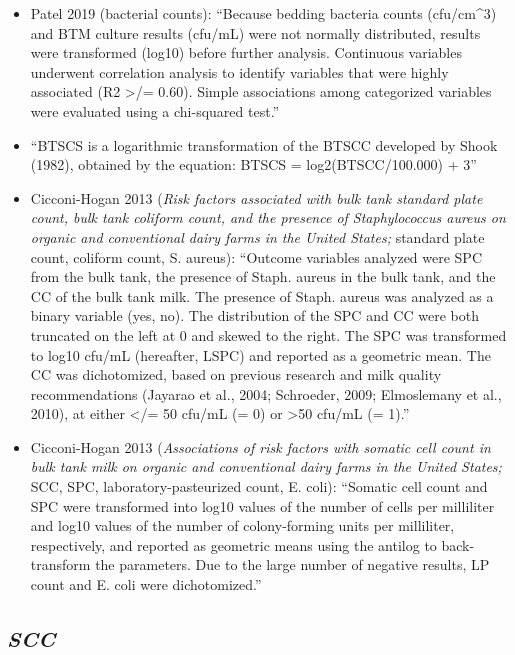 \documentclass[]{article}
\begin{document}
\begin{itemize}
\item
  Patel 2019 (bacterial counts): ``Because bedding bacteria counts
  (cfu/cm\^{}3) and BTM culture results (cfu/mL) were not normally
  distributed, results were transformed (log10) before further analysis.
  Continuous variables underwent correlation analysis to identify
  variables that were highly associated (R2 \textgreater{}/= 0.60).
  Simple associations among categorized variables were evaluated using a
  chi-squared test.''
\item
  ``BTSCS is a logarithmic transformation of the BTSCC developed by
  Shook (1982), obtained by the equation: BTSCS = log2(BTSCC/100.000) +
  3''
\item
  Cicconi-Hogan 2013 (\emph{Risk factors associated with bulk tank
  standard plate count, bulk tank coliform count, and the presence of
  Staphylococcus aureus on organic and conventional dairy farms in the
  United States;} standard plate count, coliform count, S. aureus):
  ``Outcome variables analyzed were SPC from the bulk tank, the presence
  of Staph. aureus in the bulk tank, and the CC of the bulk tank milk.
  The presence of Staph. aureus was analyzed as a binary variable (yes,
  no). The distribution of the SPC and CC were both truncated on the
  left at 0 and skewed to the right. The SPC was transformed to log10
  cfu/mL (hereafter, LSPC) and reported as a geometric mean. The CC was
  dichotomized, based on previous research and milk quality
  recommendations (Jayarao et al., 2004; Schroeder, 2009; Elmoslemany et
  al., 2010), at either \textless{}/= 50 cfu/mL (= 0) or
  \textgreater{}50 cfu/mL (= 1).''
\item
  Cicconi-Hogan 2013 (\emph{Associations of risk factors with somatic
  cell count in bulk tank milk on organic and conventional dairy farms
  in the United States;} SCC, SPC, laboratory-pasteurized count, E.
  coli): ``Somatic cell count and SPC were transformed into log10 values
  of the number of cells per milliliter and log10 values of the number
  of colony-forming units per milliliter, respectively, and reported as
  geometric means using the antilog to back-transform the parameters.
  Due to the large number of negative results, LP count and E. coli were
  dichotomized.''
\end{itemize}

\subsection{\texorpdfstring{\textbf{\emph{SCC}}}{SCC}}\label{scc}
\end{document}
